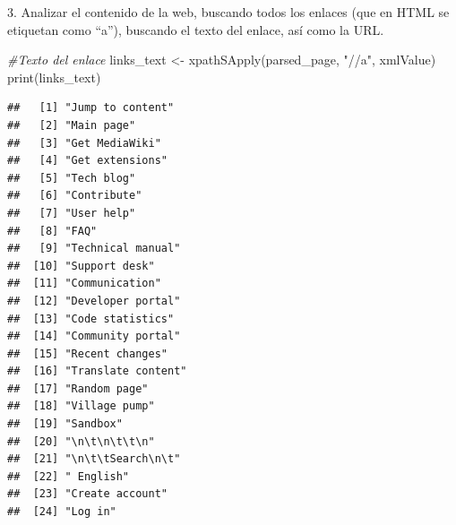 \documentclass[
]{article}
\newenvironment{Shaded}{\begin{snugshade}}{\end{snugshade}}
\newcommand{\CommentTok}[1]{\textcolor[rgb]{0.56,0.35,0.01}{\textit{#1}}}
\newcommand{\FunctionTok}[1]{\textcolor[rgb]{0.00,0.00,0.00}{#1}}
\newcommand{\NormalTok}[1]{#1}
\newcommand{\OtherTok}[1]{\textcolor[rgb]{0.56,0.35,0.01}{#1}}
\newcommand{\StringTok}[1]{\textcolor[rgb]{0.31,0.60,0.02}{#1}}
\begin{document}
3. Analizar el contenido de la web, buscando todos los enlaces (que en
HTML se etiquetan como ``a''), buscando el texto del enlace, así como la
URL.

\begin{Shaded}
\begin{Highlighting}[]
\CommentTok{\#Texto del enlace}
\NormalTok{links\_text }\OtherTok{\textless{}{-}} \FunctionTok{xpathSApply}\NormalTok{(parsed\_page, }\StringTok{"//a"}\NormalTok{, xmlValue)}
\FunctionTok{print}\NormalTok{(links\_text)}
\end{Highlighting}
\end{Shaded}

\begin{verbatim}
##   [1] "Jump to content"                                                    
##   [2] "Main page"                                                          
##   [3] "Get MediaWiki"                                                      
##   [4] "Get extensions"                                                     
##   [5] "Tech blog"                                                          
##   [6] "Contribute"                                                         
##   [7] "User help"                                                          
##   [8] "FAQ"                                                                
##   [9] "Technical manual"                                                   
##  [10] "Support desk"                                                       
##  [11] "Communication"                                                      
##  [12] "Developer portal"                                                   
##  [13] "Code statistics"                                                    
##  [14] "Community portal"                                                   
##  [15] "Recent changes"                                                     
##  [16] "Translate content"                                                  
##  [17] "Random page"                                                        
##  [18] "Village pump"                                                       
##  [19] "Sandbox"                                                            
##  [20] "\n\t\n\t\t\n"                                                       
##  [21] "\n\t\tSearch\n\t"                                                   
##  [22] " English"                                                           
##  [23] "Create account"                                                     
##  [24] "Log in"                                                             

\end{verbatim}
\end{document}
